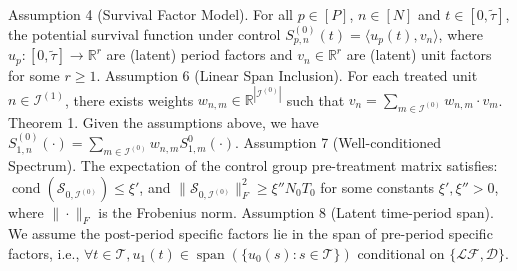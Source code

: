 Assumption 4 (Survival Factor Model). For all \(p\in[P]\), \(n\in[N]\) and \(t\in[0,\widetilde{\tau}]\), the potential survival function under control \(S^{(0)}_{p,n}(t)=\langle u_p(t),v_n\rangle\), where \(u_p:[0,\widetilde{\tau}]\to\mathbb R^r\) are (latent) period factors and \(v_n\in\mathbb R^r\) are (latent) unit factors for some \(r\ge1\). Assumption 6 (Linear Span Inclusion). For each treated unit \(n\in\mathcal I^{(1)}\), there exists weights \(w_{n,m}\in\mathbb R^{|\mathcal I^{(0)}|}\) such that \(v_n=\sum_{m\in\mathcal I^{(0)}}w_{n,m}\cdot v_m\). Theorem 1. Given the assumptions above, we have \(S^{(0)}_{1,n}(\cdot)=\sum_{m\in\mathcal I^{(0)}}w_{n,m}S^0_{1,m}(\cdot)\). Assumption 7 (Well-conditioned Spectrum). The expectation of the control group pre-treatment matrix satisfies: \(\operatorname{cond}(\mathcal S_{0,\mathcal I^{(0)}})\le\xi'\), and \(\|\mathcal S_{0,\mathcal I^{(0)}}\|_F^2\ge\xi''N_0T_0\) for some constants \(\xi',\xi''>0\), where \(\|\cdot\|_F\) is the Frobenius norm. Assumption 8 (Latent time-period span). We assume the post-period specific factors lie in the span of pre-period specific factors, i.e., \(\forall t\in\mathcal T,u_1(t)\in\operatorname{span}(\{u_0(s):s\in\mathcal T\})\) conditional on \(\{\mathcal{LF},\mathcal D\}\).
